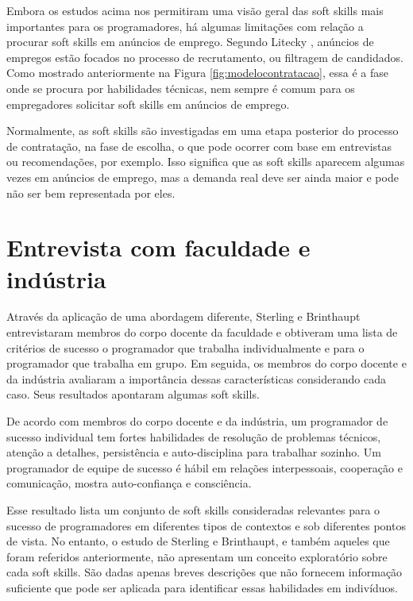 Embora os estudos acima nos permitiram uma visão geral das soft skills mais importantes para os programadores, há algumas limitações com relação a procurar soft skills em anúncios de emprego. Segundo Litecky \cite{litecky:04}, anúncios de empregos estão focados no processo de recrutamento, ou filtragem de candidados. Como mostrado anteriormente na Figura \ref{fig:modelocontratacao}, essa é a fase onde se procura por habilidades técnicas, nem sempre é comum para os empregadores solicitar soft skills em anúncios de emprego.

Normalmente, as soft skills são investigadas em uma etapa posterior do processo de contratação, na fase de escolha, o que pode ocorrer com base em entrevistas ou recomendações, por exemplo. Isso significa que as soft skills aparecem algumas vezes em anúncios de emprego, mas a demanda real deve ser ainda maior e pode não ser bem representada por eles.

\section{Entrevista com faculdade e indústria}

Através da aplicação de uma abordagem diferente, Sterling e Brinthaupt \cite{sterling:03} entrevistaram membros do corpo docente da faculdade e obtiveram uma lista de critérios de sucesso o programador que trabalha individualmente e para o programador que trabalha em grupo. Em seguida, os membros do corpo docente e da indústria avaliaram a importância dessas características considerando cada caso. Seus resultados apontaram algumas soft skills.

De acordo com membros do corpo docente e da indústria, um programador de sucesso individual tem fortes habilidades de resolução de problemas técnicos, atenção a detalhes, persistência e auto-disciplina para trabalhar sozinho. Um programador de equipe de sucesso é hábil em relações interpessoais, cooperação e comunicação, mostra auto-confiança e consciência.

Esse resultado lista um conjunto de soft skills consideradas relevantes para o sucesso de programadores em diferentes tipos de contextos e sob diferentes pontos de vista. No entanto, o estudo de Sterling e Brinthaupt, e também aqueles que foram referidos anteriormente, não apresentam um conceito exploratório sobre cada soft skills. São dadas apenas breves descrições que não fornecem informação suficiente que pode ser aplicada para identificar essas habilidades em indivíduos.


